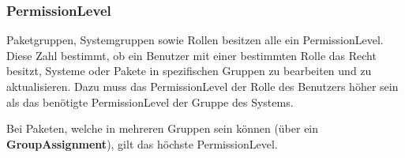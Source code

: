 \subsubsection{PermissionLevel} \label{sec:domain:permission_level}

Paketgruppen, Systemgruppen sowie Rollen besitzen alle ein PermissionLevel. Diese Zahl bestimmt, ob ein Benutzer mit einer bestimmten Rolle das Recht besitzt, Systeme oder Pakete in spezifischen Gruppen zu bearbeiten und zu aktualisieren. Dazu muss das PermissionLevel der Rolle des Benutzers höher sein als das benötigte PermissionLevel der Gruppe des Systems.

Bei Paketen, welche in mehreren Gruppen sein können (über ein \textbf{GroupAssignment}), gilt das höchste PermissionLevel.